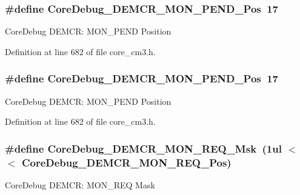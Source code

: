 \subsubsection[{\texorpdfstring{Core\+Debug\+\_\+\+D\+E\+M\+C\+R\+\_\+\+M\+O\+N\+\_\+\+P\+E\+N\+D\+\_\+\+Pos}{CoreDebug_DEMCR_MON_PEND_Pos}}]{\setlength{\rightskip}{0pt plus 5cm}\#define Core\+Debug\+\_\+\+D\+E\+M\+C\+R\+\_\+\+M\+O\+N\+\_\+\+P\+E\+N\+D\+\_\+\+Pos~17}\hypertarget{group___c_m_s_i_s___c_m3___core_debug_ga1e2f706a59e0d8131279af1c7e152f8d}{}\label{group___c_m_s_i_s___c_m3___core_debug_ga1e2f706a59e0d8131279af1c7e152f8d}
Core\+Debug D\+E\+M\+CR\+: M\+O\+N\+\_\+\+P\+E\+ND Position 

Definition at line 682 of file core\+\_\+cm3.\+h.

\subsubsection[{\texorpdfstring{Core\+Debug\+\_\+\+D\+E\+M\+C\+R\+\_\+\+M\+O\+N\+\_\+\+P\+E\+N\+D\+\_\+\+Pos}{CoreDebug_DEMCR_MON_PEND_Pos}}]{\setlength{\rightskip}{0pt plus 5cm}\#define Core\+Debug\+\_\+\+D\+E\+M\+C\+R\+\_\+\+M\+O\+N\+\_\+\+P\+E\+N\+D\+\_\+\+Pos~17}\hypertarget{group___c_m_s_i_s___c_m3___core_debug_ga1e2f706a59e0d8131279af1c7e152f8d}{}\label{group___c_m_s_i_s___c_m3___core_debug_ga1e2f706a59e0d8131279af1c7e152f8d}
Core\+Debug D\+E\+M\+CR\+: M\+O\+N\+\_\+\+P\+E\+ND Position 

Definition at line 682 of file core\+\_\+cm3.\+h.

\subsubsection[{\texorpdfstring{Core\+Debug\+\_\+\+D\+E\+M\+C\+R\+\_\+\+M\+O\+N\+\_\+\+R\+E\+Q\+\_\+\+Msk}{CoreDebug_DEMCR_MON_REQ_Msk}}]{\setlength{\rightskip}{0pt plus 5cm}\#define Core\+Debug\+\_\+\+D\+E\+M\+C\+R\+\_\+\+M\+O\+N\+\_\+\+R\+E\+Q\+\_\+\+Msk~(1ul $<$$<$ Core\+Debug\+\_\+\+D\+E\+M\+C\+R\+\_\+\+M\+O\+N\+\_\+\+R\+E\+Q\+\_\+\+Pos)}\hypertarget{group___c_m_s_i_s___c_m3___core_debug_gae6384cbe8045051186d13ef9cdeace95}{}\label{group___c_m_s_i_s___c_m3___core_debug_gae6384cbe8045051186d13ef9cdeace95}
Core\+Debug D\+E\+M\+CR\+: M\+O\+N\+\_\+\+R\+EQ Mask 

